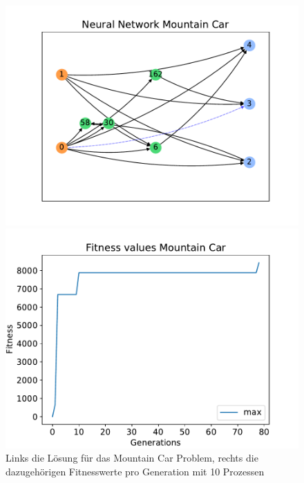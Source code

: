 \begin{figure}[!h]
	\centering
	\begin{minipage}[]{0.49\textwidth}
		\includegraphics[width=1.0\textwidth]{./img/mountain_car_single/mountain_car_neural_network.pdf} 
	\end{minipage}
	\hfill
	\begin{minipage}[]{0.49\textwidth}
		\includegraphics[width=1.0\textwidth]{./img/mountain_car_single/1413_fitness_1core_1pi.pdf} 
	\end{minipage}
	\caption{Links die Lösung für das Mountain Car Problem, rechts die dazugehörigen Fitnesswerte pro Generation mit 10 Prozessen}
	\label{fig:mountain_car_10core_neural_network_and_fitness}
\end{figure}
\\\\

